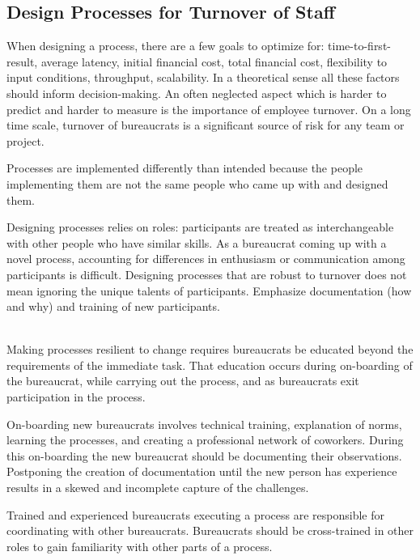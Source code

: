 \subsection*{Design Processes for Turnover of Staff\label{sec:turnover}}


When designing a \gls{process}, there are a few goals to optimize for: time-to-first-result, average latency, initial financial cost, total financial cost, flexibility to input conditions, throughput, scalability. In a theoretical sense all these factors should inform decision-making. An often neglected aspect which is harder to predict and harder to measure is the importance of employee turnover. On a long time scale, turnover of \glspl{bureaucrat} is a significant source of risk for any team or project. 

Processes are implemented differently than intended because the people implementing them are not the same people who came up with and designed them.

Designing processes relies on roles: participants are treated as interchangeable with other people who have similar skills. As a bureaucrat coming up with a novel process, accounting for differences in enthusiasm or communication among participants is difficult. 
Designing processes that are robust to turnover does not mean ignoring the unique talents of participants. 
Emphasize documentation (how and why) and training of new participants. 



\ \\

Making processes resilient to change requires  bureaucrats be educated beyond the requirements of the immediate task. That education occurs during on-boarding of the bureaucrat, while carrying out the process, and as bureaucrats exit participation in the process. 

On-boarding new bureaucrats involves technical training, explanation of norms, learning the processes, and creating a professional network of coworkers. During this on-boarding the new bureaucrat should be documenting their observations. Postponing the creation of documentation until the new person has experience results in a skewed and incomplete capture of the challenges.

Trained and experienced bureaucrats executing a process are responsible for coordinating with other bureaucrats. Bureaucrats should be cross-trained in other roles to gain familiarity with other parts of a process. 

